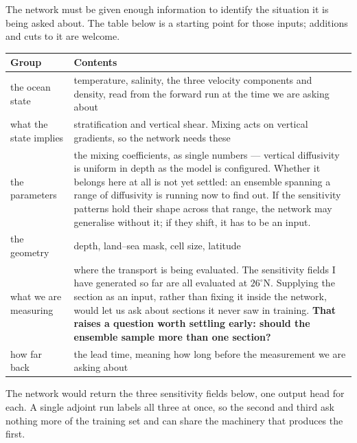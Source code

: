 The network must be given enough information to identify the situation it is being asked
about. The table below is a starting point for those inputs; additions and cuts to it are
welcome.

\smallskip
\begin{tabularx}{\textwidth}{@{}Y{0.48}Y{1.52}@{}}
\toprule
\textbf{Group} & \textbf{Contents}\\
\midrule
the ocean state
  & temperature, salinity, the three velocity components and density, read from the
    forward run at the time we are asking about\\
what the state implies
  & stratification and vertical shear. Mixing acts on vertical gradients, so the
    network needs these\\
the parameters
  & the mixing coefficients, as single numbers --- vertical diffusivity is uniform in depth
    as the model is configured. Whether it belongs here at all is not yet settled: an
    ensemble spanning a range of diffusivity is
    running now to find out. If the sensitivity patterns hold their shape across that
    range, the network may generalise without it; if they shift, it has to be an input.\\
the geometry
  & depth, land--sea mask, cell size, latitude\\
what we are measuring
  & where the transport is being evaluated. The sensitivity fields I have generated so
    far are all evaluated at $26^{\circ}$N. Supplying the section as an input, rather
    than fixing it inside the network, would let us ask about sections it never saw in
    training. \textbf{That raises a question worth settling early: should the ensemble
    sample more than one section?}\\
how far back
  & the lead time, meaning how long before the measurement we are asking about\\
\bottomrule
\end{tabularx}

The network would return the three sensitivity fields below, one output head for each. A
single adjoint run labels all three at once, so the second and third ask nothing more of
the training set and can share the machinery that produces the first.

